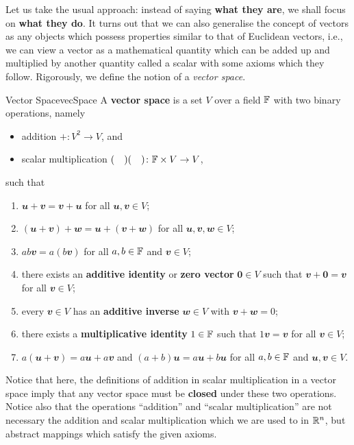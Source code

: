 \documentclass[math, code]{amznotes}
\theoremstyle{remark}
\newcommand{\zero}{\mathbf{0}}
\begin{document}
Let us take the usual approach: instead of saying \textbf{what they are}, we shall focus on \textbf{what they do}. It turns out that we can also generalise the concept of vectors as any objects which possess properties similar to that of Euclidean vectors, i.e., we can view a vector as a mathematical quantity which can be added up and multiplied by another quantity called a scalar with some axioms which they follow. Rigorously, we define the notion of a \textit{vector space}.
\begin{dfnbox}{Vector Space}{vecSpace}
    A {\color{red} \textbf{vector space}} is a set $V$ over a field $\mathbb{F}$ with two binary operations, namely 
    \begin{itemize}
        \item addition $+ \colon V^2 \to V$, and
        \item scalar multiplication $(\quad)(\quad) \colon \mathbb{F} \times V \to V$,
    \end{itemize}
    such that
    \begin{enumerate}
        \item $\mathbfit{u + v = v + u}$ for all $\mathbfit{u}, \mathbfit{v} \in V$;
        \item $\mathbfit{(u + v) + w = u + (v + w)}$ for all $\mathbfit{u, v, w} \in V$;
        \item $ab\mathbfit{v} = a(b\mathbfit{v})$ for all $a, b \in \mathbb{F}$ and $\mathbfit{v} \in V$;
        \item there exists an {\color{red} \textbf{additive identity}} or {\color{red} \textbf{zero vector}} $\zero \in V$ such that $\mathbfit{v} + \zero = \mathbfit{v}$ for all $\mathbfit{v} \in V$;
        \item every $\mathbfit{v} \in V$ has an {\color{red} \textbf{additive inverse}} $\mathbfit{w} \in V$ with $\mathbfit{v + w} = 0$;
        \item there exists a {\color{red} \textbf{multiplicative identity}} $1 \in \mathbb{F}$ such that $1\mathbfit{v} = \mathbfit{v}$ for all $\mathbfit{v} \in V$;
        \item $a\mathbfit{(u + v)} = a\mathbfit{u} + a\mathbfit{v}$ and $(a + b)\mathbfit{u} = a\mathbfit{u} + b\mathbfit{u}$ for all $a, b \in \mathbb{F}$ and $\mathbfit{u, v} \in V$.
    \end{enumerate}
\end{dfnbox}
Notice that here, the definitions of addition in scalar multiplication in a vector space imply that any vector space must be \textbf{closed} under these two operations. Notice also that the operations ``addition'' and ``scalar multiplication'' are not necessary the addition and scalar multiplication which we are used to in $\mathbb{R}^n$, but abstract mappings which satisfy the given axioms.
\end{document}
